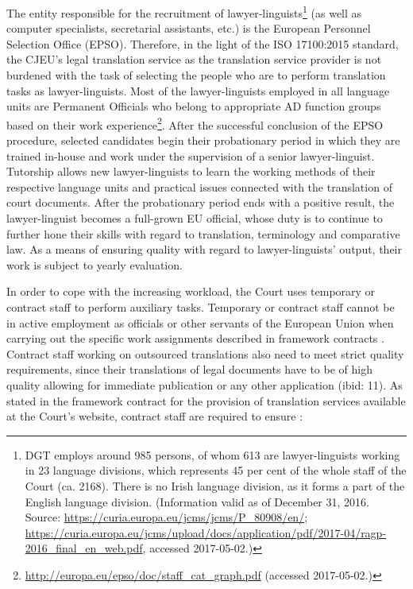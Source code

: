 \documentclass[output=paper]{langsci/langscibook}
\begin{document}
The entity responsible for the recruitment of lawyer-linguists\footnote{DGT employs around 985 persons, of whom 613 are lawyer-linguists working in 23 language divisions, which represents 45 per cent of the whole staff of the Court (ca. 2168). There is no Irish language division, as it forms a part of the English language division. (Information valid as of December 31, 2016. Source: \url{https://curia.europa.eu/jcms/jcms/P_80908/en/};
\url{https://curia.europa.eu/jcms/upload/docs/application/pdf/2017-04/ragp-2016_final_en_web.pdf},
accessed 2017-05-02.)} (as well as computer specialists, secretarial assistants, etc.) is the European Personnel Selection Office (EPSO). Therefore, in the light of the ISO 17100:2015 standard, the CJEU’s legal translation service as the translation service provider is not burdened with the task of selecting the people who are to perform translation tasks as lawyer-linguists. Most of the lawyer-linguists employed in all language units are Permanent Officials who belong to appropriate AD function groups based on their work experience\footnote{\url{http://europa.eu/epso/doc/staff_cat_graph.pdf} (accessed 2017-05-02.)}. After the successful conclusion of the EPSO procedure, selected candidates begin their probationary period in which they are trained in-house and work under the supervision of a senior lawyer-linguist. Tutorship allows new lawyer-linguists to learn the working methods of their respective language units and practical issues connected with the translation of court documents. After the probationary period ends with a positive result, the lawyer-linguist becomes a full-grown EU official, whose duty is to continue to further hone their skills with regard to translation, terminology and comparative law. As a means of ensuring quality with regard to lawyer-linguists’ output, their work is subject to yearly evaluation.

In order to cope with the increasing workload, the Court uses temporary or contract staff to perform auxiliary tasks. Temporary or contract staff cannot be in active employment as officials or other servants of the European Union when carrying out the specific work assignments described in framework contracts \citep[16]{FCPTS2017}. Contract staff working on outsourced translations also need to meet strict quality requirements, since their translations of legal documents have to be of high quality allowing for immediate publication or any other application (ibid: 11). As stated in the framework contract for the provision of translation services available at the Court’s website, contract staff are required to ensure \citep[11]{FCPTS2017}:
\end{document}
